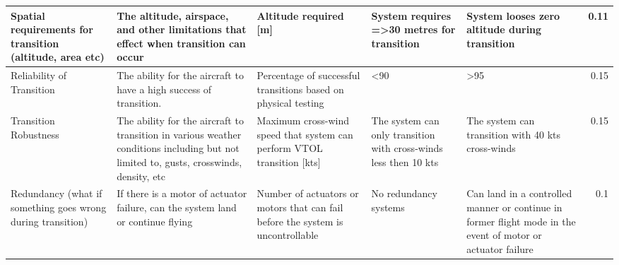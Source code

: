 \begin{table}[H]
{\begin{tabular}{|p{2cm}|p{4cm}|p{4cm}|p{4cm}|p{4cm}|r|}
Spatial requirements for transition (altitude, area etc)    & The altitude, airspace, and other limitations that effect when transition can occur                                                    & Altitude required {[}m{]}                                                       & System requires =\textgreater{}30 metres for transition          & System looses zero altitude during transition                                                               & 0.11      \\ \hline
Reliability of Transition                                   & The ability for the aircraft to have a high success of transition.                                                                     & Percentage of successful transitions based on physical testing                  & \textless{}90                                                    & \textgreater{}95                                                                                            & 0.15      \\ \hline
Transition Robustness                                       & The ability for the aircraft to transition in various weather conditions including but not limited to, gusts, crosswinds, density, etc & Maximum cross-wind speed that system can perform VTOL transition {[}kts{]}      & The system can only transition with cross-winds less then 10 kts & The system can transition with 40 kts cross-winds                                                           & 0.15      \\ \hline
Redundancy (what if something goes wrong during transition) & If there is a motor of actuator failure, can the system land or continue flying                                                        & Number of actuators or motors that can fail before the system is uncontrollable & No redundancy systems                                            & Can land in a controlled manner or continue in former flight mode in the event of motor or actuator failure & 0.1       \\ \hline
\end{tabular}%
}
\end{table}





